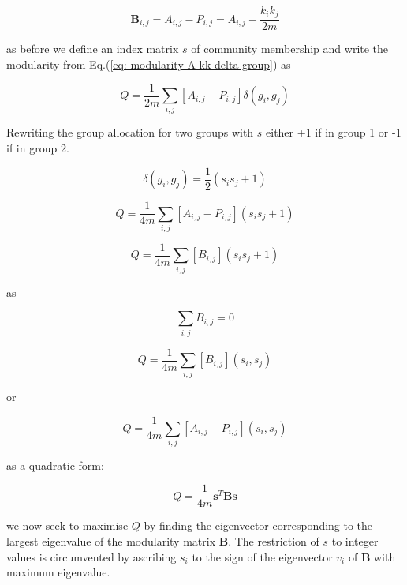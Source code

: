 \begin{equation}
\mathbf{B}_{i,j} = A_{i,j} - P_{i,j} = A_{i,j} - \frac{k_i k_j}{2m}
\end{equation}
\label{eq:modularity matrix B}

as before we define an index matrix $s$ of community membership and write the modularity from Eq.(\ref{eq: modularity A-kk delta group}) as

\begin{equation}
Q = \frac{1}{2m}\sum_{i,j}[A_{i,j}-P_{i,j}]\delta (g_i,g_j)	
\end{equation}

Rewriting the group allocation for two groups with $s$ either +1 if in group 1 or -1 if in group 2. 

\begin{equation}
\delta(g_i,g_j)	= \frac{1}{2}(s_i s_j + 1)
\end{equation}

\begin{equation}
	Q = \frac{1}{4m}\sum_{i,j}[A_{i,j}-P_{i,j}](s_i s_j + 1)
\end{equation}

\begin{equation}
	Q = \frac{1}{4m}\sum_{i,j}[B_{i,j}](s_i s_j + 1)
\end{equation}

as

\begin{equation}
\sum_{i,j} B_{i,j}=0
\end{equation}


\begin{equation}
Q = \frac{1}{4m}\sum_{i,j}[B_{i,j}](s_i,s_j)	
\end{equation}

or 

\begin{equation}
Q = \frac{1}{4m}\sum_{i,j}[A_{i,j}-P_{i,j}](s_i,s_j)	
\end{equation}

as a quadratic form:

\begin{equation}
	Q = \frac{1}{4m}\mathbf{s}^T\mathbf{Bs}
\end{equation}


we now seek to maximise $Q$ by finding the eigenvector corresponding to the largest eigenvalue of the modularity matrix $\mathbf{B}$. The restriction of $s$ to integer values is circumvented by ascribing $s_i$ to the sign of the eigenvector $v_i$
of $\mathbf{B}$ with maximum eigenvalue.

